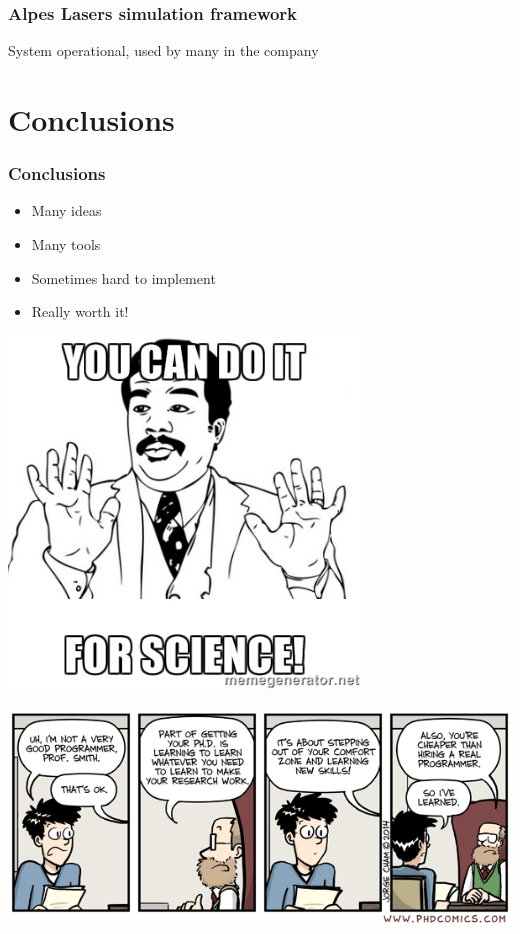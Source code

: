 \documentclass[14pt,notes]{beamer}
\begin{document}
\begin{frame}
\frametitle{Alpes Lasers simulation framework}
System operational, used by many in the company
\end{frame}

\section{Conclusions}
\begin{frame}
\frametitle{Conclusions}
\begin{itemize}
\item Many ideas
\item Many tools
\item Sometimes hard to implement
\item \alert{Really worth it!}
\end{itemize}
\end{frame}
\begin{frame}
\centering
\includegraphics[width=0.7\textwidth]{doit}

\end{frame}
\begin{frame}
\includegraphics[width=\textwidth]{sad_truth}
\end{frame}
\end{document}
